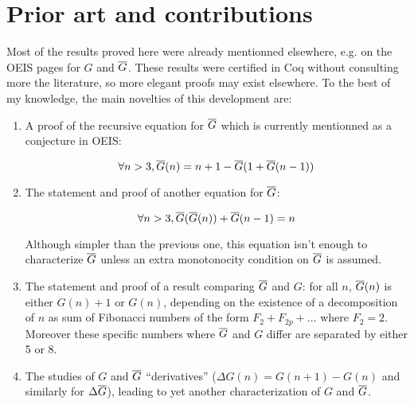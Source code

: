 \documentclass[a4paper,11pt]{article}
\begin{document}
\section{Prior art and contributions}
Most of the results proved here were already mentionned elsewhere,
e.g. on the OEIS pages for $G$ and $\overline{G}$. These results were certified
in Coq without consulting more the literature, so more elegant proofs
may exist elsewhere. To the best of my knowledge, the main novelties
of this development are:
\begin{enumerate}
\item
  A proof of the recursive
equation for $\overline{G}$ which is currently mentionned as a conjecture in OEIS:

$$\forall n>3, \overline{G}(n) = n+1 - \overline{G}(1+\overline{G}(n-1))$$

\item
  The statement and proof of another equation for $\overline{G}$:

$$\forall n>3, \overline{G}(\overline{G}(n)) + \overline{G}(n-1) = n$$

Although simpler than the previous one, this equation isn't
enough to characterize $\overline{G}$ unless an extra monotonocity
condition on $\overline{G}$ is assumed.

\item
  The statement and proof of a result comparing $\overline{G}$ and $G$:
for all $n$, $\overline{G}(n)$ is either $G(n)+1$ or $G(n)$, depending
on the existence of a decomposition of $n$ as sum of Fibonacci numbers
of the form $F_2 + F_{2p} + ...$ where $F_2 = 2$. Moreover these
specific numbers where $\overline{G}$ and $G$ differ are separated by either
5 or 8.

\item The studies of $G$ and $\overline{G}$ ``derivatives''
  ($\Delta G(n) = G(n+1)-G(n)$ and similarly for $\Delta\overline{G}$),
  leading to yet another characterization of $G$ and $\overline{G}$.

\end{enumerate}
\end{document}
